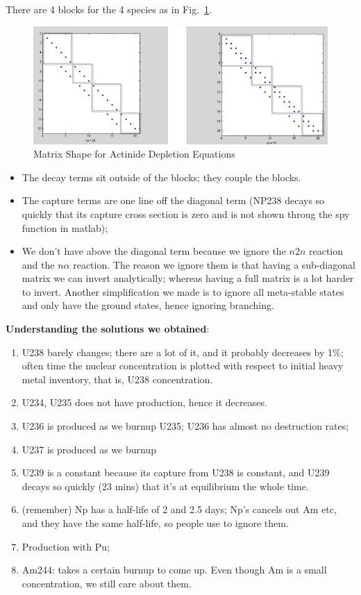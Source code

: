 \documentclass{school-22.211-notes}
\begin{document}
There are 4 blocks for the 4 species as in Fig.~\ref{actinide-block}. 
\begin{figure}[ht]
  \centering
  \includegraphics[width=5in]{images/dfs/actinide-block.png}
  \caption{Matrix Shape for Actinide Depletion Equations} \label{actinide-block} 
    \end{figure}
\begin{itemize}
\item The decay terms sit outside of the blocks; they couple the blocks.
\item  The capture terms are one line off the diagonal term (NP238 decays so quickly that its capture cross section is zero and is not shown throug the spy function in matlab); 
\item We don't have above the diagonal term because we ignore the $n2n$ reaction and the $n \alpha$ reaction. The reason we ignore them is that having a sub-diagonal matrix we can invert analytically; whereas having a full matrix is a lot harder to invert. Another simplification we made is to ignore all meta-stable states and only have the ground states, hence ignoring branching. 
\end{itemize}

\textbf{Understanding the solutions we obtained}:
\begin{enumerate}
\item U238 barely changes; there are a lot of it, and it probably decreases by 1\%; often time the nuclear concentration is plotted with respect to initial heavy metal inventory, that is, U238 concentration. 
\item U234, U235 does not have production, hence it decreases. 
\item U236 is produced as we burnup U235; U236 has almost no destruction rates;
\item U237 is produced as we burnup 
\item U239 is a constant because its capture from U238 is constant, and U239 decays so quickly (23 mins) that it's at equilibrium the whole time. 
\item (remember) Np has a half-life of 2 and 2.5 days; Np's cancels out Am etc, and they have the same half-life, so people use to ignore them. 
\item Production with Pu; 
\item Am244: takes a certain burnup to come up. Even though Am is a small concentration, we still care about them. 
\end{enumerate}
\end{document}
